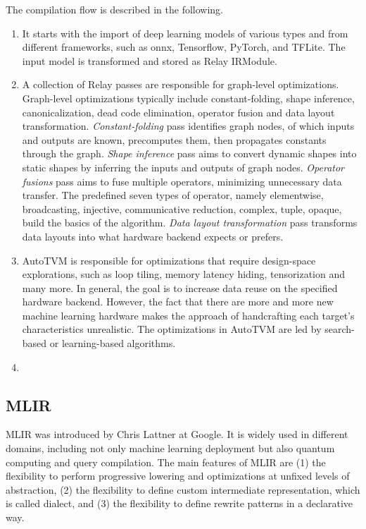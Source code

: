 The compilation flow is described in the following.
\begin{enumerate}
    \item It starts with the import of deep learning models of various types and from different frameworks, such as onnx, Tensorflow, PyTorch, and TFLite. The input model is transformed and stored as Relay IRModule.
    \item A collection of Relay passes are responsible for graph-level optimizations. Graph-level optimizations typically include constant-folding, shape inference, canonicalization, dead code elimination, operator fusion and data layout transformation. \textit{Constant-folding} pass identifies graph nodes, of which inputs and outputs are known, precomputes them, then propagates constants through the graph. \textit{Shape inference} pass aims to convert dynamic shapes into static shapes by inferring the inputs and outputs of graph nodes. \textit{Operator fusions} pass aims to fuse multiple operators, minimizing unnecessary data transfer. The predefined seven types of operator, namely elementwise, broadcasting, injective, communicative reduction, complex, tuple, opaque, build the basics of the algorithm.
    \textit{Data layout transformation} pass transforms data layouts into what hardware backend expects or prefers.
    \item AutoTVM is responsible for optimizations that require design-space explorations, such as loop tiling, memory latency hiding, tensorization and many more. In general, the goal is to increase data reuse on the specified hardware backend. However, the fact that there are more and more new machine learning hardware makes the approach of handcrafting each target's characteristics unrealistic. The optimizations in AutoTVM are led by search-based or learning-based algorithms.
    \item 
    
\end{enumerate}

\subsection{MLIR}
MLIR was introduced by Chris Lattner at Google. It is widely used in different domains, including not only machine learning deployment but also quantum computing and query compilation. The main features of MLIR are (1) the flexibility to perform progressive lowering and optimizations at unfixed levels of abstraction, (2) the flexibility to define custom intermediate representation, which is called dialect, and (3) the flexibility to define rewrite patterns in a declarative way.

